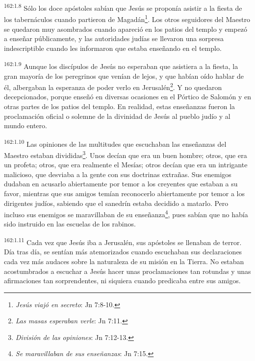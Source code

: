 \par 
\textsuperscript{162:1.8} Sólo los doce apóstoles sabían que Jesús se proponía asistir a la fiesta de los tabernáculos cuando partieron de Magadán\footnote{\textit{Jesús viajó en secreto}: Jn 7:8-10.}. Los otros seguidores del Maestro se quedaron muy asombrados cuando apareció en los patios del templo y empezó a enseñar públicamente, y las autoridades judías se llevaron una sorpresa indescriptible cuando les informaron que estaba enseñando en el templo.

\par 
\textsuperscript{162:1.9} Aunque los discípulos de Jesús no esperaban que asistiera a la fiesta, la gran mayoría de los peregrinos que venían de lejos, y que habían oído hablar de él, albergaban la esperanza de poder verlo en Jerusalén\footnote{\textit{Las masas esperaban verle}: Jn 7:11.}. Y no quedaron decepcionados, porque enseñó en diversas ocasiones en el Pórtico de Salomón y en otras partes de los patios del templo. En realidad, estas enseñanzas fueron la proclamación oficial o solemne de la divinidad de Jesús al pueblo judío y al mundo entero.

\par 
\textsuperscript{162:1.10} Las opiniones de las multitudes que escuchaban las enseñanzas del Maestro estaban divididas\footnote{\textit{División de las opiniones}: Jn 7:12-13.}. Unos decían que era un buen hombre; otros, que era un profeta; otros, que era realmente el Mesías; otros decían que era un intrigante malicioso, que desviaba a la gente con sus doctrinas extrañas. Sus enemigos dudaban en acusarlo abiertamente por temor a los creyentes que estaban a su favor, mientras que sus amigos temían reconocerlo abiertamente por temor a los dirigentes judíos, sabiendo que el sanedrín estaba decidido a matarlo. Pero incluso sus enemigos se maravillaban de su enseñanza\footnote{\textit{Se maravillaban de sus enseñanzas}: Jn 7:15.}, pues sabían que no había sido instruido en las escuelas de los rabinos.

\par 
\textsuperscript{162:1.11} Cada vez que Jesús iba a Jerusalén, sus apóstoles se llenaban de terror. Día tras día, se sentían más atemorizados cuando escuchaban sus declaraciones cada vez más audaces sobre la naturaleza de su misión en la Tierra. No estaban acostumbrados a escuchar a Jesús hacer unas proclamaciones tan rotundas y unas afirmaciones tan sorprendentes, ni siquiera cuando predicaba entre sus amigos.

